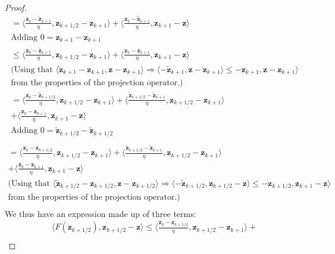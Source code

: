 \begin{proof}
\begin{align*}
    = \Bigg \langle\frac{\bm{z}_k-\tilde{\bm{z}}_{k+1}}{\eta}, \bm{z}_{k+1/2} - \bm{z}_{k+1} \Bigg\rangle +
    \Bigg \langle\frac{\bm{z}_k-\tilde{\bm{z}}_{k+1}}{\eta}, \bm{z}_{k+1} -\bm{z} \Bigg\rangle \\ \text{Adding $0=\bm{z}_{k+1}-\textbf{z}_{k+1}$} \\
    \leq \Bigg \langle\frac{\bm{z}_k-\tilde{\bm{z}}_{k+1}}{\eta}, \bm{z}_{k+1/2} -\bm{z}_{k+1} \Bigg\rangle +
    \Bigg \langle\frac{\bm{z}_k-{\bm{z}}_{k+1}}{\eta}, \bm{z}_{k+1} -\bm{z} \Bigg\rangle \\  
    \text{(Using that }
    \langle \tilde{\bm{z}}_{k+1} - {\bm{z}}_{k+1}, \bm{z} -\bm{z}_{k+1} \rangle \Rightarrow 
    \langle - \tilde{\bm{z}}_{k+1} , \bm{z} -\bm{z}_{k+1} \rangle \leq - {\bm{z}}_{k+1}, \bm{z} -\bm{z}_{k+1} \rangle\\
    \text{from the properties of the projection operator.)} \\
    = \Bigg \langle\frac{\bm{z}_k-\tilde{\bm{z}}_{k+1/2}}{\eta}, \bm{z}_{k+1/2} -\bm{z}_{k+1} \Bigg\rangle +
    \Bigg \langle\frac{\tilde{\bm{z}}_{k+1/2}-\tilde{\bm{z}}_{k+1}}{\eta}, \bm{z}_{k+1/2} -\bm{z}_{k+1} \Bigg\rangle \\+ 
    \Bigg \langle\frac{\bm{z}_k-{\bm{z}}_{k+1}}{\eta}, \bm{z}_{k+1} -\bm{z} \Bigg\rangle \\  
    \text{Adding $0=\tilde{\bm{z}}_{k+1/2}-\tilde{\bm{z}}_{k+1/2}$} \\
\end{align*}
\begin{align*}
    = \Bigg \langle\frac{\bm{z}_k-{\bm{z}}_{k+1/2}}{\eta}, \bm{z}_{k+1/2} -\bm{z}_{k+1} \Bigg\rangle +
    \Bigg \langle\frac{\tilde{\bm{z}}_{k+1/2}-\tilde{\bm{z}}_{k+1}}{\eta}, \bm{z}_{k+1/2} -\bm{z}_{k+1} \Bigg\rangle \\+ 
    \Bigg \langle\frac{\bm{z}_k-{\bm{z}}_{k+1}}{\eta}, \bm{z}_{k+1} -\bm{z} \Bigg\rangle \\  
    \text{(Using that }
    \langle \tilde{\bm{z}}_{k+1/2} - {\bm{z}}_{k+1/2}, \bm{z} -\bm{z}_{k+1/2} \rangle \Rightarrow 
    \langle - \tilde{\bm{z}}_{k+1/2} , \bm{z}_{k+1/2} -\bm{z} \rangle \leq - {\bm{z}}_{k+1/2}, \bm{z}_{k+1} -\bm{z} \rangle\\
    \text{from the properties of the projection operator.)} \\
\end{align*}
We thus have an expression made up of three terms:
\begin{align*}
    \langle F(\bm{z}_{k+1/2}), \bm{z}_{k+1/2} -\bm{z} \rangle \leq \Bigg \langle\frac{\bm{z}_k-{\bm{z}}_{k+1/2}}{\eta}, \bm{z}_{k+1/2} -\bm{z}_{k+1} \Bigg\rangle + \\

\end{align*}
\end{proof}
